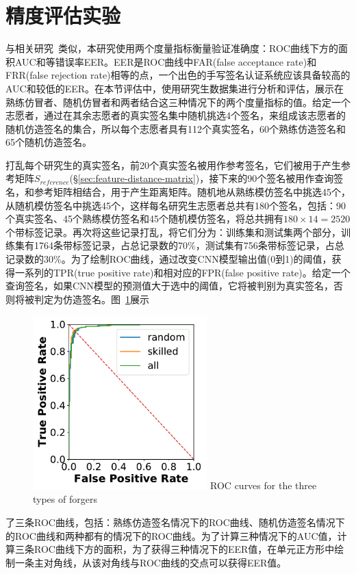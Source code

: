 \section{精度评估实验}
\label{sec:accuracy-experiment}

与相关研究~\cite{fischer2015robust,levy2018handwritten}类似，本研究使用两个度量指标衡量验证准确度：ROC曲线下方的面积AUC和等错误率EER。EER是ROC曲线中FAR(false acceptance rate)和FRR(false rejection rate)相等的点，一个出色的手写签名认证系统应该具备较高的AUC和较低的EER。在本节评估中，使用研究生数据集进行分析和评估，展示在熟练仿冒者、随机仿冒者和两者结合这三种情况下的两个度量指标的值。给定一个志愿者，通过在其余志愿者的真实签名集中随机挑选4个签名，来组成该志愿者的随机仿造签名的集合，所以每个志愿者具有112个真实签名，60个熟练仿造签名和65个随机仿造签名。

打乱每个研究生的真实签名，前20个真实签名被用作参考签名，它们被用于产生参考矩阵$S_{reference}$(\S\ref{sec:feature-distance-matrix})，接下来的90个签名被用作查询签名，和参考矩阵相结合，用于产生距离矩阵。随机地从熟练模仿签名中挑选45个，从随机模仿签名中挑选45个，这样每名研究生志愿者总共有180个签名，包括：90个真实签名、45个熟练模仿签名和45个随机模仿签名，将总共拥有$180\times 14=2520$个带标签记录。再次将这些记录打乱，将它们分为：训练集和测试集两个部分，训练集有1764条带标签记录，占总记录数的70\%，测试集有756条带标签记录，占总记录数的30\%。为了绘制ROC曲线，通过改变CNN模型输出值(0到1)的阈值，获得一系列的TPR(true positive rate)和相对应的FPR(false positive rate)。给定一个查询签名，如果CNN模型的预测值大于选中的阈值，它将被判别为真实签名，否则将被判定为仿造签名。图~\ref{fig:roc-forgers}展示
\begin{figure}[!htp]
  \centering
  \includegraphics[width=0.6\textwidth]{figure/mimic-random-total-ROC-curves.pdf}
      {ROC curves for the three types of forgers}
  \label{fig:roc-forgers}
\end{figure}
了三条ROC曲线，包括：熟练仿造签名情况下的ROC曲线、随机仿造签名情况下的ROC曲线和两种都有的情况下的ROC曲线。为了计算三种情况下的AUC值，计算三条ROC曲线下方的面积，为了获得三种情况下的EER值，在单元正方形中绘制一条主对角线，从该对角线与ROC曲线的交点可以获得EER值。

